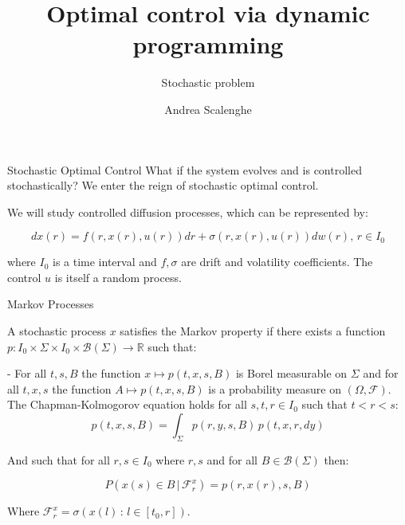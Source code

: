 \documentclass[10pt, compress]{beamer}
\title{Optimal control via dynamic programming}
\subtitle{Stochastic problem}
\author{Andrea Scalenghe}
\institute{Tesi magistrale}
\newcommand{\R}{\mathbb{R}}
\begin{document}
\maketitle

\begin{frame}{Stochastic Optimal Control}
    What if the system evolves and is controlled stochastically? We enter the reign of stochastic optimal control. 

    We will study controlled diffusion processes, which can be represented by:

    \begin{equation}\label{SDE}
        dx(r) = f(r,x(r),u(r))dr + \sigma(r,x(r),u(r))dw(r),\, r\in I_0
    \end{equation}

    where $I_0$ is a time interval and $f,\sigma$ are drift and volatility coefficients. The control $u$ is itself a random process.
\end{frame}

\begin{frame}{Markov Processes}
    \begin{definition}\label{2-1-markovprocessdef}
    A stochastic process $x$ satisfies the Markov property if there exists a function 
    $p:I_0\times \Sigma\times I_0\times  \mathcal{B}(\Sigma)\rightarrow \R$ such that:


        - For all $t,s,B$ the function $x\mapsto p(t,x,s,B)$ is Borel measurable on $\Sigma$ and for all $t,x,s$ the function $A\mapsto p(t,x,s,B)$ is a probability measure on $(\Omega,\mathcal{F})$. The Chapman-Kolmogorov equation holds for all $s,t,r\in I_0$ such that $t<r<s$:
        \begin{equation}\label{2-1-markovprocessdef-chapkol}
            p(t,x,s,B) = \int_{\Sigma} p(r,y,s,B)\,p(t,x,r,dy)
        \end{equation}


    And such that for all $r,s\in I_0$ where $r,s$ and for all $B\in\mathcal{B}(\Sigma)$ then:

    \begin{equation}\label{2-1-markovprocessdef-condonp}
        P(x(s)\in B\,|\,\mathcal{F}_r^x) = p(r,x(r),s,B)
    \end{equation}

    Where $\mathcal{F}_r^x=\sigma\left(x(l)\,:\,l\in[t_0,r]\right)$.
\end{definition}

\end{frame}
\end{document}
